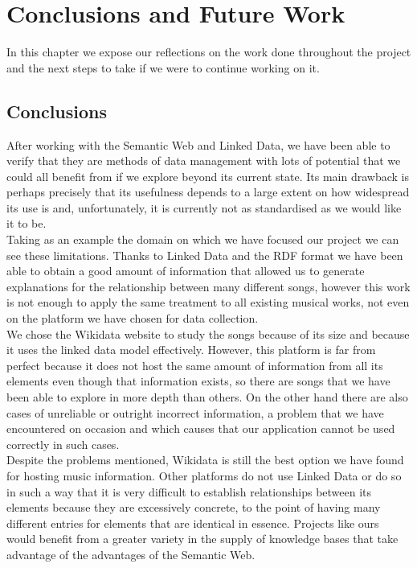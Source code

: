 \chapter{Conclusions and Future Work}
\label{cap:conclusions}

In this chapter we expose our reflections on the work done throughout the project and the next steps to take if we were to continue working on it.\\


\section{Conclusions}

After working with the Semantic Web and Linked Data, we have been able to verify that they are methods of data management with lots of potential that we could all benefit from if we explore beyond its current state. Its main drawback is perhaps precisely that its usefulness depends to a large extent on how widespread its use is and, unfortunately, it is currently not as standardised as we would like it to be.\\

Taking as an example the domain on which we have focused our project we can see these limitations. Thanks to Linked Data and the RDF format we have been able to obtain a good amount of information that allowed us to generate explanations for the relationship between many different songs, however this work is not enough to apply the same treatment to all existing musical works, not even on the platform we have chosen for data collection.\\

We chose the Wikidata website to study the songs because of its size and because it uses the linked data model effectively. However, this platform is far from perfect because it does not host the same amount of information from all its elements even though that information exists, so there are songs that we have been able to explore in more depth than others. On the other hand there are also cases of unreliable or outright incorrect information, a problem that we have encountered on occasion and which causes that our application cannot be used correctly in such cases.\\

Despite the problems mentioned, Wikidata is still the best option we have found for hosting music information. Other platforms do not use Linked Data or do so in such a way that it is very difficult to establish relationships between its elements because they are excessively concrete, to the point of having many different entries for elements that are identical in essence. Projects like ours would benefit from a greater variety in the supply of knowledge bases that take advantage of the advantages of the Semantic Web.\\

